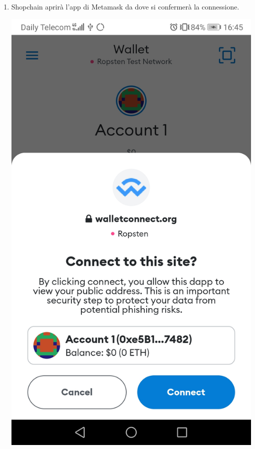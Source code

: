 \begin{enumerate}
     \item Shopchain aprirà l'app di Metamask da dove si confermerà la connessione.\\
     \begin{center}
        \includegraphics[scale = 0.1]{img/connectNotificaMobile.jpg}
    \end{center}
    

\end{enumerate}

